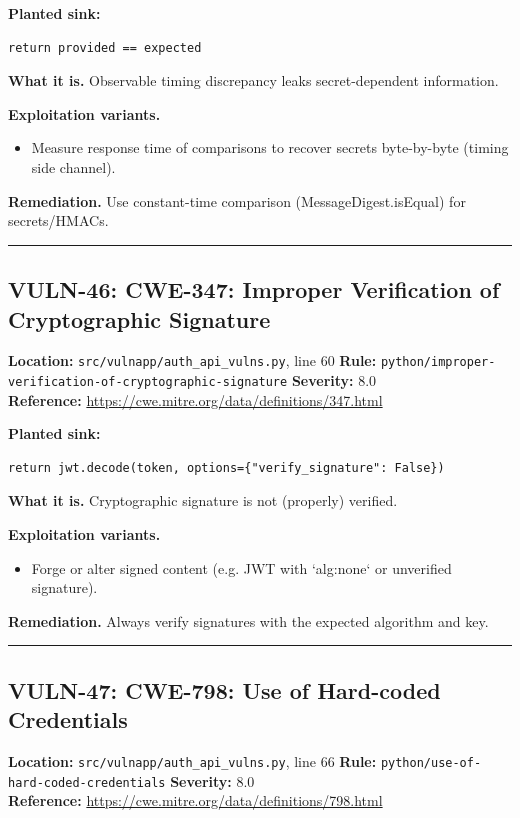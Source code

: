 \documentclass[11pt,a4paper]{article}
\begin{document}
\noindent\textbf{Planted sink:}
\begin{lstlisting}
return provided == expected
\end{lstlisting}
\noindent\textbf{What it is.} Observable timing discrepancy leaks secret-dependent information.

\noindent\textbf{Exploitation variants.}
\begin{itemize}[leftmargin=1.4em,itemsep=1pt,topsep=2pt]
\item Measure response time of comparisons to recover secrets byte-by-byte (timing side channel).
\end{itemize}
\noindent\textbf{Remediation.} Use constant-time comparison (MessageDigest.isEqual) for secrets/HMACs.

\vspace{4pt}\hrule\vspace{6pt}
\subsection{VULN-46: CWE-347: Improper Verification of Cryptographic Signature}
\noindent\textbf{Location:} \texttt{src/vulnapp/auth\_api\_vulns.py}, line 60 \quad \textbf{Rule:} \texttt{python/improper-verification-of-cryptographic-signature} \quad \textbf{Severity:} 8.0
\\ \textbf{Reference:} \url{https://cwe.mitre.org/data/definitions/347.html}

\noindent\textbf{Planted sink:}
\begin{lstlisting}
return jwt.decode(token, options={"verify_signature": False})
\end{lstlisting}
\noindent\textbf{What it is.} Cryptographic signature is not (properly) verified.

\noindent\textbf{Exploitation variants.}
\begin{itemize}[leftmargin=1.4em,itemsep=1pt,topsep=2pt]
\item Forge or alter signed content (e.g. JWT with `alg:none` or unverified signature).
\end{itemize}
\noindent\textbf{Remediation.} Always verify signatures with the expected algorithm and key.

\vspace{4pt}\hrule\vspace{6pt}
\subsection{VULN-47: CWE-798: Use of Hard-coded Credentials}
\noindent\textbf{Location:} \texttt{src/vulnapp/auth\_api\_vulns.py}, line 66 \quad \textbf{Rule:} \texttt{python/use-of-hard-coded-credentials} \quad \textbf{Severity:} 8.0
\\ \textbf{Reference:} \url{https://cwe.mitre.org/data/definitions/798.html}
\end{document}
